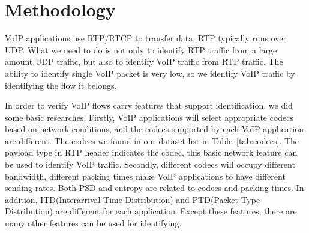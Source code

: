 \documentclass[conference]{IEEEtran}
\begin{document}

\section{Methodology}
\label{sec:methodology}

VoIP applications use RTP/RTCP to transfer data, RTP typically runs over UDP. What we need to do is not only to identify RTP traffic from a large amount UDP traffic, but also to identify VoIP traffic from RTP traffic. The ability to identify single VoIP packet is very low, so we identify VoIP traffic by identifying the flow it belongs.

In order to verify VoIP flows carry features that support identification, we did some basic researches. Firstly, VoIP applications will select appropriate codecs based on network conditions, and the codecs supported by each VoIP application are different. The codecs we found in our dataset list in Table~\ref{tab:codecs}. The payload type in RTP header indicates the codec, this basic network feature can be used to identify VoIP traffic. Secondly, different codecs will occupy different bandwidth, different packing times make VoIP applications to have different sending rates. Both PSD \cite{22} and entropy \cite{4} are related to codecs and packing times. In addition, ITD(Interarrival Time Distribution) and PTD(Packet Type Distribution) are different for each application. Except these features, there are many other features can be used for identifying. 
\end{document}
